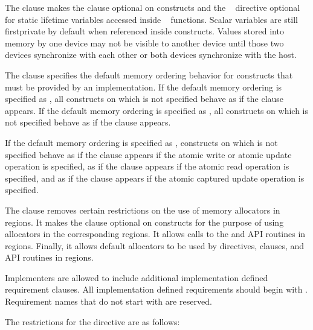 The  clause makes the  clause optional
on  constructs and the ~
directive optional for static lifetime variables accessed inside
~ functions.  Scalar variables are still
firstprivate by default when referenced inside  constructs.  Values stored into
memory by one device may not be visible to another device until those two
devices synchronize with each other or both devices synchronize with the host.

The  clause specifies the default memory ordering
behavior for  constructs that must be provided by an
implementation. If the default memory ordering is specified as , all
 constructs on which  is not specified
behave as if the  clause appears. If the default memory
ordering is specified as , all  constructs on which
 is not specified behave as if the 
clause appears.

If the default memory ordering is specified as , 
constructs on which  is not specified behave as if
the  clause appears if the atomic write or atomic update
operation is specified, as if the  clause appears if the atomic
read operation is specified, and as if the  clause appears if
the atomic captured update operation is specified.

The  clause removes certain restrictions on the use
of memory allocators in  regions. It makes the
 clause optional on  constructs for the
purpose of using allocators in the corresponding  regions. It
allows calls to the  and 
API routines in  regions. Finally, it allows default allocators
to be used by  directives,  clauses, and
 API routines in  regions.

Implementers are allowed to include additional implementation defined
requirement clauses.  All implementation defined requirements should begin with
.  Requirement names that do not start with  are
reserved.

\restrictions
The restrictions for the  directive are as follows:

